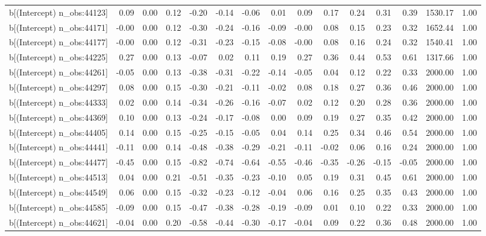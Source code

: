 \begin{table}[ht]
\begin{tabular}{rrrrrrrrrrrrrrr}
  b[(Intercept) n\_obs:44123] & 0.09 & 0.00 & 0.12 & -0.20 & -0.14 & -0.06 & 0.01 & 0.09 & 0.17 & 0.24 & 0.31 & 0.39 & 1530.17 & 1.00 \\ 
  b[(Intercept) n\_obs:44171] & -0.00 & 0.00 & 0.12 & -0.30 & -0.24 & -0.16 & -0.09 & -0.00 & 0.08 & 0.15 & 0.23 & 0.32 & 1652.44 & 1.00 \\ 
  b[(Intercept) n\_obs:44177] & -0.00 & 0.00 & 0.12 & -0.31 & -0.23 & -0.15 & -0.08 & -0.00 & 0.08 & 0.16 & 0.24 & 0.32 & 1540.41 & 1.00 \\ 
  b[(Intercept) n\_obs:44225] & 0.27 & 0.00 & 0.13 & -0.07 & 0.02 & 0.11 & 0.19 & 0.27 & 0.36 & 0.44 & 0.53 & 0.61 & 1317.66 & 1.00 \\ 
  b[(Intercept) n\_obs:44261] & -0.05 & 0.00 & 0.13 & -0.38 & -0.31 & -0.22 & -0.14 & -0.05 & 0.04 & 0.12 & 0.22 & 0.33 & 2000.00 & 1.00 \\ 
  b[(Intercept) n\_obs:44297] & 0.08 & 0.00 & 0.15 & -0.30 & -0.21 & -0.11 & -0.02 & 0.08 & 0.18 & 0.27 & 0.36 & 0.46 & 2000.00 & 1.00 \\ 
  b[(Intercept) n\_obs:44333] & 0.02 & 0.00 & 0.14 & -0.34 & -0.26 & -0.16 & -0.07 & 0.02 & 0.12 & 0.20 & 0.28 & 0.36 & 2000.00 & 1.00 \\ 
  b[(Intercept) n\_obs:44369] & 0.10 & 0.00 & 0.13 & -0.24 & -0.17 & -0.08 & 0.00 & 0.09 & 0.19 & 0.27 & 0.35 & 0.42 & 2000.00 & 1.00 \\ 
  b[(Intercept) n\_obs:44405] & 0.14 & 0.00 & 0.15 & -0.25 & -0.15 & -0.05 & 0.04 & 0.14 & 0.25 & 0.34 & 0.46 & 0.54 & 2000.00 & 1.00 \\ 
  b[(Intercept) n\_obs:44441] & -0.11 & 0.00 & 0.14 & -0.48 & -0.38 & -0.29 & -0.21 & -0.11 & -0.02 & 0.06 & 0.16 & 0.24 & 2000.00 & 1.00 \\ 
  b[(Intercept) n\_obs:44477] & -0.45 & 0.00 & 0.15 & -0.82 & -0.74 & -0.64 & -0.55 & -0.46 & -0.35 & -0.26 & -0.15 & -0.05 & 2000.00 & 1.00 \\ 
  b[(Intercept) n\_obs:44513] & 0.04 & 0.00 & 0.21 & -0.51 & -0.35 & -0.23 & -0.10 & 0.05 & 0.19 & 0.31 & 0.45 & 0.61 & 2000.00 & 1.00 \\ 
  b[(Intercept) n\_obs:44549] & 0.06 & 0.00 & 0.15 & -0.32 & -0.23 & -0.12 & -0.04 & 0.06 & 0.16 & 0.25 & 0.35 & 0.43 & 2000.00 & 1.00 \\ 
  b[(Intercept) n\_obs:44585] & -0.09 & 0.00 & 0.15 & -0.47 & -0.38 & -0.28 & -0.19 & -0.09 & 0.01 & 0.10 & 0.22 & 0.33 & 2000.00 & 1.00 \\ 
  b[(Intercept) n\_obs:44621] & -0.04 & 0.00 & 0.20 & -0.58 & -0.44 & -0.30 & -0.17 & -0.04 & 0.09 & 0.22 & 0.36 & 0.48 & 2000.00 & 1.00 \\ 

\end{tabular}
\end{table}
